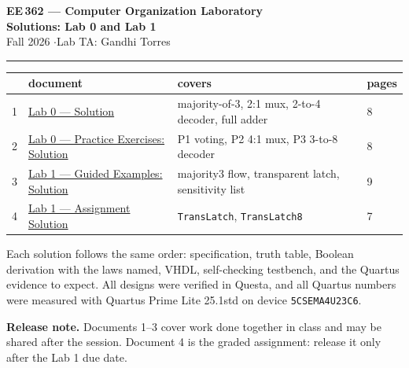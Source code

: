 \documentclass[11pt]{article}
\newcommand{\code}[1]{\texttt{#1}}
\begin{document}

\begin{center}
{\LARGE\bfseries EE\,362 --- Computer Organization Laboratory}\\[6pt]
{\Large\bfseries Solutions: Lab 0 and Lab 1}\\[6pt]
Fall 2026 \quad$\cdot$\quad Lab TA: Gandhi Torres
\end{center}

\vspace{14pt}
\hrule
\vspace{14pt}

\begin{center}
\renewcommand{\arraystretch}{1.35}
\begin{tabular}{rlll}
\toprule
& document & covers & pages \\
\midrule
1 & \hyperlink{doc1.1}{Lab 0 --- Solution}
  & majority-of-3, 2:1 mux, 2-to-4 decoder, full adder & 8 \\
2 & \hyperlink{doc2.1}{Lab 0 --- Practice Exercises: Solution}
  & P1 voting, P2 4:1 mux, P3 3-to-8 decoder & 8 \\
3 & \hyperlink{doc3.1}{Lab 1 --- Guided Examples: Solution}
  & majority3 flow, transparent latch, sensitivity list & 9 \\
4 & \hyperlink{doc4.1}{Lab 1 --- Assignment Solution}
  & \code{TransLatch}, \code{TransLatch8} & 7 \\
\bottomrule
\end{tabular}
\end{center}

\vspace{14pt}

Each solution follows the same order: specification, truth table, Boolean derivation
with the laws named, VHDL, self-checking testbench, and the Quartus evidence to
expect. All designs were verified in Questa, and all Quartus numbers were measured
with Quartus Prime Lite 25.1std on device \code{5CSEMA4U23C6}.

\vspace{10pt}
\textbf{Release note.} Documents 1--3 cover work done together in class and may be
shared after the session. Document 4 is the graded assignment: release it only after
the Lab 1 due date.





\end{document}
